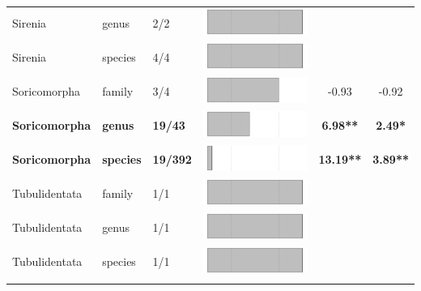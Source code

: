 \begin{longtable}{lL{1.8cm}C{2cm}lcc}
  Sirenia & genus & 2/2 & \includegraphics[width=0.20\linewidth, height=0.05\linewidth]{Table_figures/bar77.pdf} &   &   \\ 
  Sirenia & species & 4/4 & \includegraphics[width=0.20\linewidth, height=0.05\linewidth]{Table_figures/bar78.pdf} &   &   \\ 
  Soricomorpha & family & 3/4 & \includegraphics[width=0.20\linewidth, height=0.05\linewidth]{Table_figures/bar79.pdf} & -0.93 & -0.92 \\ 
  \textbf{Soricomorpha} & \textbf{genus} & \textbf{19/43} & \includegraphics[width=0.20\linewidth, height=0.05\linewidth]{Table_figures/bar80.pdf} & \textbf{6.98**} & \textbf{2.49*} \\ 
  \textbf{Soricomorpha} & \textbf{species} & \textbf{19/392} & \includegraphics[width=0.20\linewidth, height=0.05\linewidth]{Table_figures/bar81.pdf} & \textbf{13.19**} & \textbf{3.89**} \\ 
  Tubulidentata & family & 1/1 & \includegraphics[width=0.20\linewidth, height=0.05\linewidth]{Table_figures/bar82.pdf} &   &   \\ 
  Tubulidentata & genus & 1/1 & \includegraphics[width=0.20\linewidth, height=0.05\linewidth]{Table_figures/bar83.pdf} &   &   \\ 
  Tubulidentata & species & 1/1 & \includegraphics[width=0.20\linewidth, height=0.05\linewidth]{Table_figures/bar84.pdf} &   &   \\ 
   \hline
\hline
\label{Table_results}
\end{longtable}
